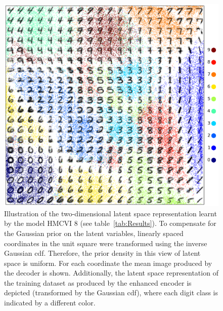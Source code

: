\begin{appendices}
\begin{figure}[hb]
\centering
\includegraphics[width=\columnwidth]{figures/learned_representation_train_points_small.pdf}
\caption{Illustration of the two-dimensional latent space representation learnt by the model HMCVI 8 (see table~\ref{tab:Results}). To compensate for the Gaussian prior on the latent variables, linearly spaced coordinates in the unit square were transformed using the inverse Gaussian cdf. Therefore, the prior density in this view of latent space is uniform. For each coordinate the mean image produced by the decoder is shown. Additionally, the latent space representation of the training dataset as produced by the enhanced encoder is depicted (transformed by the Gaussian cdf), where each digit class is indicated by a different color.}
\label{fig:2d_latent_visualization}
\end{figure}

\end{appendices}